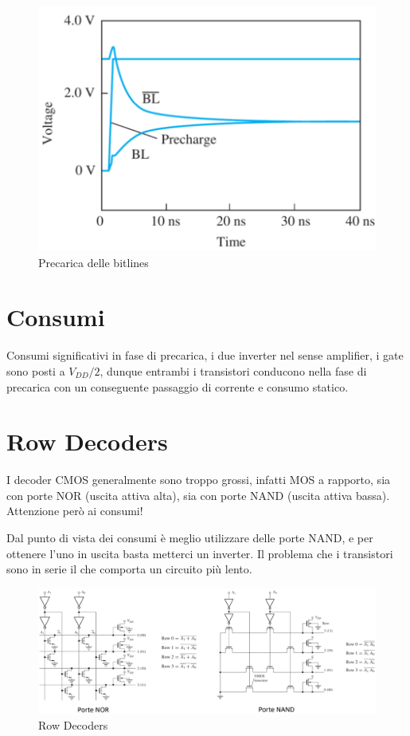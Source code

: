 \begin{figure}[htbp]
    \centering
    \includegraphics[width=0.5\linewidth]{img/prcaroca.png}
    \caption{Precarica delle bitlines}
\end{figure}

\newpage
\section{Consumi}

Consumi significativi in fase di precarica, i due inverter nel sense amplifier, i gate sono posti a $V_{DD}/2$, dunque entrambi i transistori conducono nella fase di precarica con un conseguente passaggio di corrente e consumo statico.



\section{Row Decoders}

I decoder CMOS generalmente sono troppo grossi, infatti MOS a rapporto, sia con porte NOR
(uscita attiva alta), sia con porte NAND (uscita attiva bassa). Attenzione però ai consumi!

Dal punto di vista dei consumi è meglio utilizzare delle porte NAND, e per ottenere l'uno in uscita basta metterci un inverter. Il problema che i transistori sono in serie il che comporta un circuito più lento.

\begin{figure}[htbp]
    \centering
    \includegraphics[width=1\linewidth]{img/row_dec.png}
    \caption{Row Decoders}
\end{figure}

